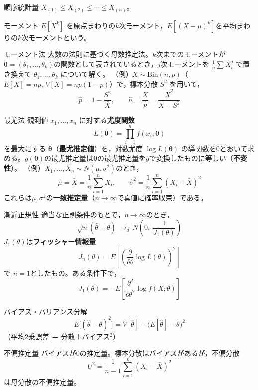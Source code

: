 \documentclass[a4paper,11pt]{ltjsarticle}
\begin{document}
\begin{term}{順序統計量}
$X_{(1)} \le X_{(2)} \le \cdots \le X_{(n)}$。
\end{term}

\begin{term}{モーメント}
$E[X^k]$ を原点まわりの$k$次モーメント，$E[(X-\mu)^k]$を平均まわりの$k$次モーメントという。
\end{term}

\begin{term}{モーメント法}
大数の法則に基づく母数推定法。$k$次までのモーメントが $\bm\theta=(\theta_1,\dots,\theta_k)$の関数として表されているとき，$j$次モーメントを $\frac1n\sum X_i^j$ で置き換えて $\theta_1,\dots,\theta_k$ について解く。
（例）$X\sim\mathrm{Bin}(n,p)$（$E[X]=np,\,V[X]=np(1-p)$）で，標本分散 $S^2$ を用いて，
\[
\hat p = 1-\frac{S^2}{\bar X},\qquad \hat n=\frac{\bar X}{\hat p}=\frac{\bar X^2}{\bar X-S^2}
\]
\end{term}

\begin{term}{最尤法}
観測値 $x_1,\dots,x_n$ に対する\textbf{尤度関数}
\[
L(\bm\theta) = \prod_{i=1}^n f(x_i;\bm\theta)
\]
を最大にする $\bm\theta$（\textbf{最尤推定値}）を，対数尤度 $\log L(\bm\theta)$ の導関数を0とおいて求める。$g(\bm\theta)$の最尤推定量は$\bm\theta$の最尤推定量を$g$で変換したものに等しい（\textbf{不変性}）。
（例）$X_1,\dots,X_n\sim N(\mu,\sigma^2)$のとき，
\[
\hat\mu = \bar X = \frac1n\sum_{i=1}^n X_i,
\qquad
\hat\sigma^2 = \frac1n\sum_{i=1}^n (X_i-\bar X)^2
\]
これらは$\mu,\sigma^2$の\textbf{一致推定量}（$n\to\infty$で真値に確率収束）である。
\end{term}

\begin{term}{漸近正規性}
適当な正則条件のもとで，$n\to\infty$のとき，
\[
\sqrt n(\hat\theta-\theta) \ \to_d\ N\!\left(0,\ \frac{1}{J_1(\theta)}\right)
\]
$J_1(\theta)$は\textbf{フィッシャー情報量}
\[
J_n(\theta) = E\!\left[\left(\frac{\partial}{\partial\theta}\log L(\theta)\right)^2\right]
\]
で $n=1$としたもの。ある条件下で，
\[
J_1(\theta) = -E\!\left[\frac{\partial^2}{\partial\theta^2}\log f(X;\theta)\right]
\]
\end{term}

\begin{term}{バイアス・バリアンス分解}
\[
E\big[(\hat\theta-\theta)^2\big] = V[\hat\theta] + \big(E[\hat\theta]-\theta\big)^2
\]
（平均2乗誤差 ＝ 分散＋バイアス$^2$）
\end{term}

\begin{term}{不偏推定量}
バイアスが0の推定量。標本分散はバイアスがあるが，不偏分散
\[
U^2 = \frac{1}{n-1}\sum_{i=1}^n(X_i-\bar X)^2
\]
は母分散の不偏推定量。
\end{term}
\end{document}
